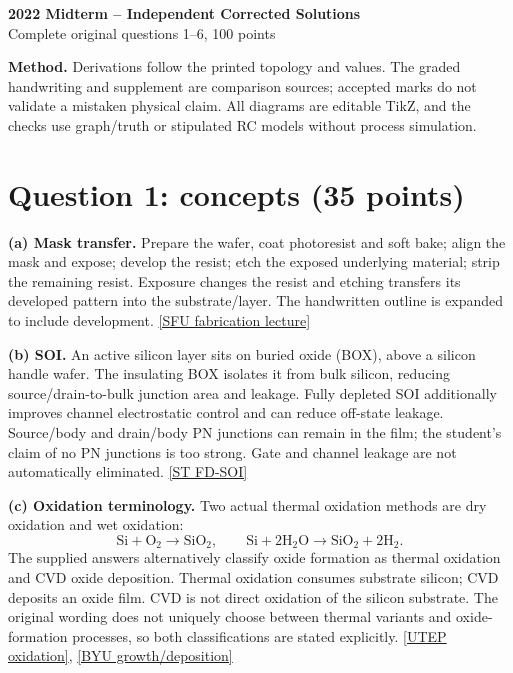 \documentclass[10pt]{article}
\begin{document}
\begin{center}\large\textbf{2022 Midterm -- Independent Corrected Solutions}\\\normalsize Complete original questions 1--6, 100 points\end{center}
\textbf{Method.} Derivations follow the printed topology and values. The graded handwriting and supplement are comparison sources; accepted marks do not validate a mistaken physical claim. All diagrams are editable TikZ, and the checks use graph/truth or stipulated RC models without process simulation.
\section*{Question 1: concepts (35 points)}
\textbf{(a) Mask transfer.} Prepare the wafer, coat photoresist and soft bake; align the mask and expose; develop the resist; etch the exposed underlying material; strip the remaining resist. Exposure changes the resist and etching transfers its developed pattern into the substrate/layer. The handwritten outline is expanded to include development. \href{https://www.sfu.ca/~gchapman/e495/e495l3l.pdf}{[SFU fabrication lecture]}

\textbf{(b) SOI.} An active silicon layer sits on buried oxide (BOX), above a silicon handle wafer. The insulating BOX isolates it from bulk silicon, reducing source/drain-to-bulk junction area and leakage. Fully depleted SOI additionally improves channel electrostatic control and can reduce off-state leakage. Source/body and drain/body PN junctions can remain in the film; the student's claim of no PN junctions is too strong. Gate and channel leakage are not automatically eliminated. \href{https://www.st.com/content/st_com/en/about/innovation-and-technology/fd-soi.html}{[ST FD-SOI]}

\textbf{(c) Oxidation terminology.} Two actual thermal oxidation methods are dry oxidation and wet oxidation:
\[\mathrm{Si+O_2\to SiO_2},\qquad\mathrm{Si+2H_2O\to SiO_2+2H_2}.\]
The supplied answers alternatively classify oxide formation as thermal oxidation and CVD oxide deposition. Thermal oxidation consumes substrate silicon; CVD deposits an oxide film. CVD is not direct oxidation of the silicon substrate. The original wording does not uniquely choose between thermal variants and oxide-formation processes, so both classifications are stated explicitly. \href{https://www.utep.edu/engineering/nanomil/processes/oxidation_basics.html}{[UTEP oxidation]}, \href{https://www.cleanroom.byu.edu/FilmDeposition}{[BYU growth/deposition]}
\end{document}
